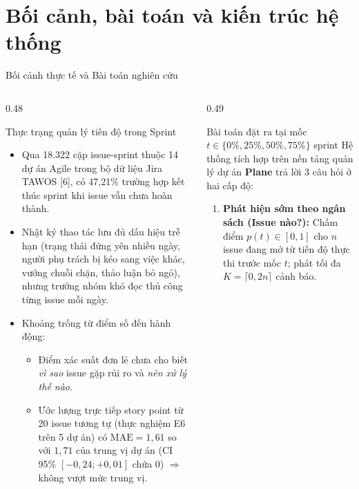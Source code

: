 \section{Bối cảnh, bài toán và kiến trúc hệ thống}

\begin{frame}{Bối cảnh thực tế và Bài toán nghiên cứu}
  \scriptsize
  \begin{columns}[T,onlytextwidth]
    \begin{column}{0.48\textwidth}
      \begin{block}{Thực trạng quản lý tiến độ trong Sprint}
        \begin{itemize}
          \setlength{\itemsep}{2pt}
          \item Qua 18.322 cặp issue-sprint thuộc 14 dự án Agile trong bộ dữ liệu Jira TAWOS [6], có \alert{47,21\%} trường hợp kết thúc sprint khi issue vẫn chưa hoàn thành.
          \item Nhật ký thao tác lưu đủ dấu hiệu trễ hạn (trạng thái đứng yên nhiều ngày, người phụ trách bị kéo sang việc khác, vướng chuỗi chặn, thảo luận bỏ ngỏ), nhưng trưởng nhóm khó đọc thủ công từng issue mỗi ngày.
          \item \alert{Khoảng trống từ điểm số đến hành động:}
            \begin{itemize}
              \scriptsize
              \item Điểm xác suất đơn lẻ chưa cho biết \emph{vì sao} issue gặp rủi ro và \emph{nên xử lý thế nào}.
              \item Ước lượng trực tiếp story point từ 20 issue tương tự (thực nghiệm E6 trên 5 dự án) có $\text{MAE} = 1{,}61$ so với $1{,}71$ của trung vị dự án (CI 95\% $[-0{,}24; +0{,}01]$ chứa 0) $\Rightarrow$ không vượt mức trung vị.
            \end{itemize}
        \end{itemize}
      \end{block}
    \end{column}
    \begin{column}{0.49\textwidth}
      \begin{alertblock}{Bài toán đặt ra tại mốc $t \in \{0\%, 25\%, 50\%, 75\%\}$ sprint}
        Hệ thống tích hợp trên nền tảng quản lý dự án \textbf{Plane} trả lời 3 câu hỏi ở hai cấp độ:
        \begin{enumerate}
          \setlength{\itemsep}{2.5pt}
          \item \textbf{Phát hiện sớm theo ngân sách (Issue nào?):} Chấm điểm $p(t) \in [0,1]$ cho $n$ issue đang mở từ tiến độ thực thi trước mốc $t$; phát tối đa $K = \lceil 0{,}2n \rceil$ cảnh báo.

\end{enumerate}
\end{alertblock}
\end{column}
\end{columns}
\end{frame}

